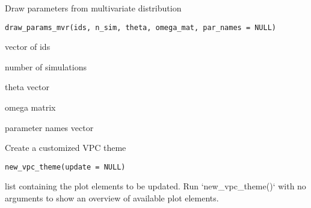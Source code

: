 \documentclass[letterpaper]{book}
\begin{document}
%
\begin{Description}\relax
Draw parameters from multivariate distribution
\end{Description}
%
\begin{Usage}
\begin{verbatim}
draw_params_mvr(ids, n_sim, theta, omega_mat, par_names = NULL)
\end{verbatim}
\end{Usage}
%
\begin{Arguments}
\begin{ldescription}
\item[\code{ids}] vector of ids

\item[\code{n\_sim}] number of simulations

\item[\code{theta}] theta vector

\item[\code{omega\_mat}] omega matrix

\item[\code{par\_names}] parameter names vector
\end{ldescription}
\end{Arguments}
%
\begin{Description}\relax
Create a customized VPC theme
\end{Description}
%
\begin{Usage}
\begin{verbatim}
new_vpc_theme(update = NULL)
\end{verbatim}
\end{Usage}
%
\begin{Arguments}
\begin{ldescription}
\item[\code{update}] list containing the plot elements to be updated. Run `new\_vpc\_theme()` with no arguments to show an overview of available plot elements.
\end{ldescription}
\end{Arguments}
%
\end{document}

